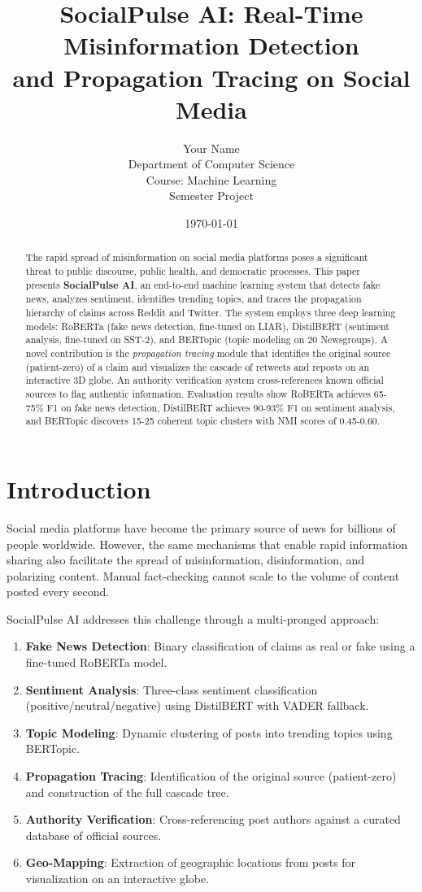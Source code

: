 \documentclass[12pt,a4paper]{article}
\title{\textbf{SocialPulse AI: Real-Time Misinformation Detection\\and Propagation Tracing on Social Media}}
\author{Your Name\\Department of Computer Science\\Course: Machine Learning\\Semester Project}
\date{\today}
\begin{document}
\maketitle

\begin{abstract}
The rapid spread of misinformation on social media platforms poses a significant threat to public discourse, public health, and democratic processes. This paper presents \textbf{SocialPulse AI}, an end-to-end machine learning system that detects fake news, analyzes sentiment, identifies trending topics, and traces the propagation hierarchy of claims across Reddit and Twitter. The system employs three deep learning models: RoBERTa (fake news detection, fine-tuned on LIAR), DistilBERT (sentiment analysis, fine-tuned on SST-2), and BERTopic (topic modeling on 20 Newsgroups). A novel contribution is the \textit{propagation tracing} module that identifies the original source (patient-zero) of a claim and visualizes the cascade of retweets and reposts on an interactive 3D globe. An authority verification system cross-references known official sources to flag authentic information. Evaluation results show RoBERTa achieves 65-75\% F1 on fake news detection, DistilBERT achieves 90-93\% F1 on sentiment analysis, and BERTopic discovers 15-25 coherent topic clusters with NMI scores of 0.45-0.60.
\end{abstract}

\section{Introduction}
Social media platforms have become the primary source of news for billions of people worldwide. However, the same mechanisms that enable rapid information sharing also facilitate the spread of misinformation, disinformation, and polarizing content. Manual fact-checking cannot scale to the volume of content posted every second.

SocialPulse AI addresses this challenge through a multi-pronged approach:
\begin{enumerate}[label=(\arabic*)]
    \item \textbf{Fake News Detection}: Binary classification of claims as real or fake using a fine-tuned RoBERTa model.
    \item \textbf{Sentiment Analysis}: Three-class sentiment classification (positive/neutral/negative) using DistilBERT with VADER fallback.
    \item \textbf{Topic Modeling}: Dynamic clustering of posts into trending topics using BERTopic.
    \item \textbf{Propagation Tracing}: Identification of the original source (patient-zero) and construction of the full cascade tree.
    \item \textbf{Authority Verification}: Cross-referencing post authors against a curated database of official sources.
    \item \textbf{Geo-Mapping}: Extraction of geographic locations from posts for visualization on an interactive globe.
\end{enumerate}
\end{document}
